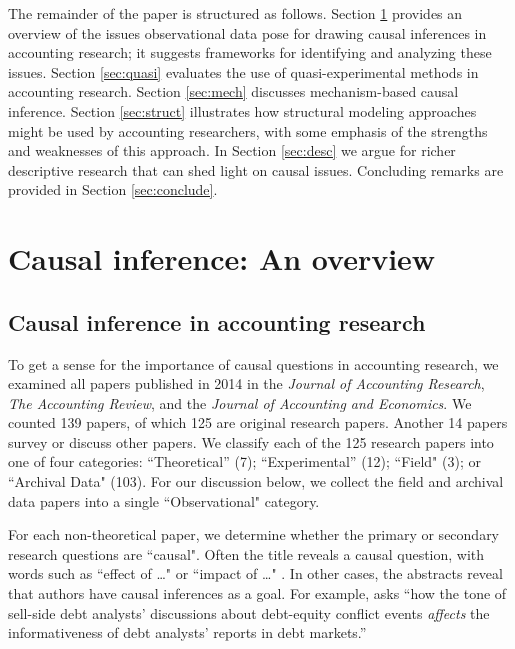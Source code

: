 \documentclass[12pt,reqno,titlepage]{amsart}
\begin{document}
\begin{doublespace}
\vskip 10pt
The remainder of the paper is structured as follows.
Section \ref{sec:causal} provides an overview of the issues observational data pose for drawing causal inferences in accounting research; 
it suggests frameworks for identifying and analyzing these issues.
Section \ref{sec:quasi} evaluates the use of quasi-experimental methods in accounting research.
Section \ref{sec:mech} discusses mechanism-based causal inference.
Section \ref{sec:struct} illustrates how structural modeling approaches might be used by accounting researchers, with some emphasis of the strengths and weaknesses of this approach.
In Section \ref{sec:desc} we argue for richer descriptive research that can shed light on causal issues.
Concluding remarks are provided in Section \ref{sec:conclude}.

\section{Causal inference: An overview} \label{sec:causal}

\subsection{Causal inference in accounting research}

To get a sense for the importance of causal questions in accounting research,
we examined all papers published in 2014 in the \textit{Journal of Accounting Research}, \textit{The Accounting Review}, and the \textit{Journal of Accounting and Economics}.
We counted 139 papers, of which 125 are original research papers. Another 14 papers survey or discuss other papers.
We classify each of the 125 research papers into one of four categories:  ``Theoretical'' (7); ``Experimental'' (12); ``Field" (3); or ``Archival Data" (103). 
For our discussion below, we collect the field and archival data papers into a single  ``Observational" category.

For each non-theoretical paper, we determine whether the primary or secondary research questions are ``causal". 
Often the title reveals a causal question, with words such as ``effect of \dots" or ``impact of \dots" \citep[e.g.][]{Cohen:2014jl,Clorproell:2014cv}. 
In other cases, the abstracts reveal that authors have causal inferences as a goal. 
For example, \citet{deFranco:2014ct} asks ``how the tone of sell-side debt analysts' discussions about debt-equity conflict events \emph{affects} the informativeness of debt analysts' reports in debt markets.''


\end{doublespace}
\end{document}
